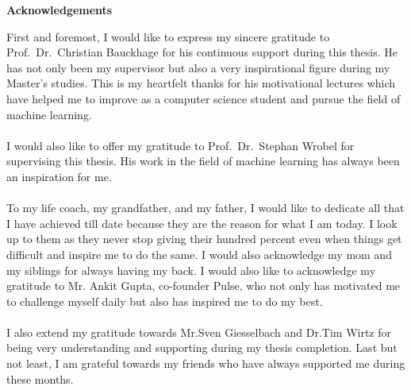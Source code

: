 \thispagestyle{empty}

\centerline{\Large{\textbf{Acknowledgements}}}

\vspace{2cm}

\noindent 
First and foremost, I would like to express my sincere gratitude to Prof.~Dr.~Christian Bauckhage for his continuous support during this thesis. He has not only been my supervisor but also a very inspirational figure during my Master's studies. This is my heartfelt thanks for his motivational lectures which have helped me to improve as a computer science student and pursue the field of machine learning. \\\\
I would also like to offer my gratitude to Prof.~Dr.~Stephan Wrobel for supervising this thesis. His work in the field of machine learning has always been an inspiration for me.\\\\
To my life coach, my grandfather, and my father, I would like to dedicate all that I have achieved till date because they are the reason for what I am today. I look up to them as they never stop giving their hundred percent even when things get difficult and inspire me to do the same. I would also acknowledge my mom and my siblings for always having my back. I would also like to acknowledge my gratitude to Mr. Ankit Gupta, co-founder Pulse, who not only has motivated me to challenge myself daily but also has inspired me to do my best.\\\\
I also extend my gratitude towards Mr.Sven Giesselbach and Dr.Tim Wirtz for being very understanding and supporting during my thesis completion. Last but not least, I am grateful towards my friends who have always supported me during these months.


\newpage
\thispagestyle{empty}

\rule{0cm}{5cm}
